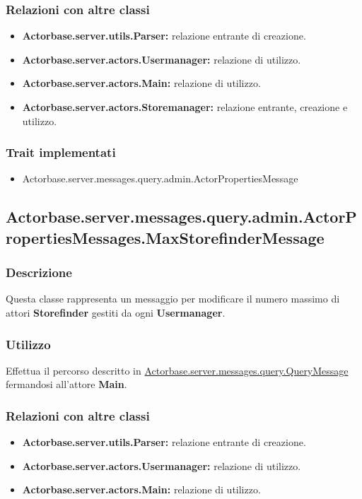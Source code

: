 \documentclass[a4paper]{article}
\begin{document}
			\subsubsection{Relazioni con altre classi}
				\begin{itemize}
					\item \textbf{Actorbase.server.utils.Parser:} relazione entrante di creazione.
					\item \textbf{Actorbase.server.actors.Usermanager:} relazione di utilizzo.
					\item \textbf{Actorbase.server.actors.Main:} relazione di utilizzo.
					\item \textbf{Actorbase.server.actors.Storemanager:} relazione entrante, creazione e utilizzo.
				\end{itemize}
			\subsubsection{Trait implementati}
				\begin{itemize}
					\item Actorbase.server.messages.query.admin.ActorPropertiesMessage
				\end{itemize}
				
		\subsection{Actorbase.server.messages.query.admin.ActorPropertiesMessages.MaxStorefinderMessage}
			\subsubsection{Descrizione}
				Questa classe rappresenta un messaggio per modificare il numero massimo di attori \textbf{Storefinder} gestiti da ogni \textbf{Usermanager}.
				
			\subsubsection{Utilizzo}
				Effettua il percorso descritto in \hyperref[QueryMessage]{Actorbase.server.messages.query.QueryMessage} fermandosi all'attore 
				\textbf{Main}.
				
			\subsubsection{Relazioni con altre classi}
				\begin{itemize}
					\item \textbf{Actorbase.server.utils.Parser:} relazione entrante di creazione.
					\item \textbf{Actorbase.server.actors.Usermanager:} relazione di utilizzo.
					\item \textbf{Actorbase.server.actors.Main:} relazione di utilizzo.
				\end{itemize}
\end{document}
